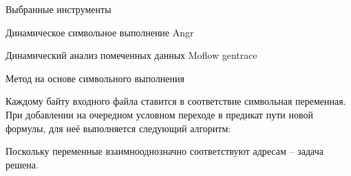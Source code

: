 \documentclass[10pt]{beamer}
\begin{document}
\begin{frame}{Выбранные инструменты}
    \begin{block}{Динамическое символьное выполнение}
      Angr
    \end{block}
    \begin{block}{Динамический анализ помеченных данных}
        Moflow gentrace
    \end{block}
\end{frame}


\begin{frame}{Метод на основе символьного выполнения}

Каждому байту входного файла ставится в соответствие символьная переменная.
При добавлении на очередном условном переходе в предикат пути новой формулы, для неё выполняется следующий алгоритм:

\begin{algorithm}[H]
\SetAlgoLined
{}
  \caption{Метод на основе символьного выполнения}
\end{algorithm}
Поскольку переменные взаимнооднозначно соответствуют адресам -- задача решена.
\end{frame}


\end{document}
